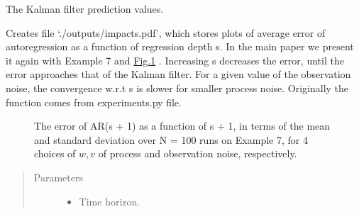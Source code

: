 \documentclass[letterpaper,10pt,english]{sphinxmanual}
\begin{document}
\begin{fulllineitems}
\label{\detokenize{LDS:LDS.OnlineLDS_library.prediction_kalman}}
\sphinxAtStartPar
The Kalman filter prediction values.

\end{fulllineitems}


\begin{fulllineitems}
\label{\detokenize{LDS:LDS.OnlineLDS_library.testImpactOfS}}
\sphinxAtStartPar
Creates file ‘./outputs/impacts.pdf’, which stores plots of average error of auto\sphinxhyphen{}regression
as a function of regression depth s. In the main paper we present it again with Example 7
and \hyperref[\detokenize{LDS:fig4}]{Fig.\@ \ref{\detokenize{LDS:fig4}}} .
Increasing s decreases the error, until the error approaches that of the Kalman filter.
For a given value of the observation noise, the convergence w.r.t s is slower for
smaller process noise.
Originally the function comes from experiments.py file.

\begin{figure}[htbp]
\centering
\capstart

\noindent{}
\caption{The error of AR(s + 1) as a function of s + 1, in terms of the mean
and standard deviation over N = 100 runs on Example 7, for 4 choices of \(w, v\)
of process and observation noise, respectively.}\label{\detokenize{LDS:id3}}\label{\detokenize{LDS:fig4}}\end{figure}
\begin{quote}\begin{description}
\item[{Parameters}] \leavevmode\begin{itemize}
\item {} 
\sphinxAtStartPar
{} \textendash{} Time horizon.


\end{itemize}
\end{description}
\end{quote}
\end{fulllineitems}
\end{document}

